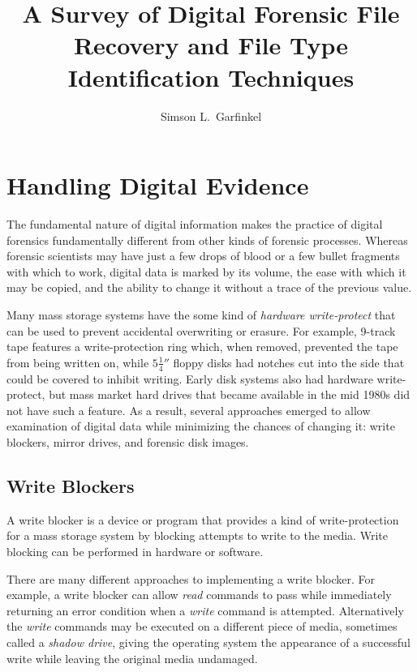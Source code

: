 \documentclass[11pt,letter]{article}
\begin{document}
\title{A Survey of Digital Forensic File Recovery and File Type
  Identification Techniques}
\author{Simson L.\ Garfinkel}
\maketitle
{}

     

\chapter{Handling Digital Evidence}
The fundamental nature of digital information makes the practice of
digital forensics fundamentally different from other kinds of forensic
processes.  Whereas forensic scientists may have just a few drops of
blood or a few bullet fragments with which to work, digital data is
marked by its volume, the ease with which it may be copied, and the
ability to change it without a trace of the previous value.

Many mass storage systems have the some kind of \emph{hardware
  write-protect} that can be used to prevent accidental overwriting or
erasure. For example, 9-track tape features a
write-protection ring which, when removed, prevented the tape from
being written on, while $5\frac{1}{4}''$ floppy disks had notches cut into
the side that could be covered to inhibit writing. Early disk systems
also had hardware write-protect, but mass market hard drives that
became available in the mid 1980s did not have such a feature. As a
result, several approaches emerged to allow examination of digital
data while minimizing the chances of changing it: write
blockers, mirror drives, and forensic disk images.

\section{Write Blockers}

A write blocker is a device or program that provides a kind of
write-protection for a mass storage system by blocking attempts to
write to the media. Write blocking can be performed in hardware or
software. 

There are many different approaches to implementing a write
blocker. For example, a write blocker can allow \emph{read} commands
to pass while immediately returning an error condition when a
\emph{write} command is attempted. Alternatively the \emph{write}
commands may be executed on a different piece of media, sometimes
called a \emph{shadow drive}, giving the operating system the
appearance of a successful write while leaving the original media
undamaged.
\end{document}
